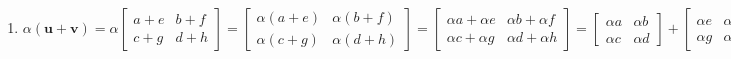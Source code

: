 \documentclass{report}
\begin{document}
\begin{enumerate}
    \item $\alpha (\bm{u} + \bm{v}) = \alpha
    \begin{bmatrix}
        a + e & b + f \\
        c + g & d + h
    \end{bmatrix}
    =
    \begin{bmatrix}
        \alpha (a+e) & \alpha (b+f) \\
        \alpha (c+g) & \alpha (d+h)
    \end{bmatrix}
    =
    \begin{bmatrix}
        \alpha a + \alpha e & \alpha b + \alpha f \\
        \alpha c + \alpha g & \alpha d + \alpha h
    \end{bmatrix}
    =
    \begin{bmatrix}
        \alpha a & \alpha b\\
        \alpha c & \alpha d
    \end{bmatrix}
    +
    \begin{bmatrix}
        \alpha e & \alpha f \\
        \alpha g & \alpha h
    \end{bmatrix}
    =
    \alpha
    \begin{bmatrix}
        a & b \\
        c & d
    \end{bmatrix}
    +
    \alpha
    \begin{bmatrix}
        e & f \\
        g & h
    \end{bmatrix}
    =
    \alpha \bm{u} + \alpha \bm{v}
    $


\end{enumerate}
\end{document}
